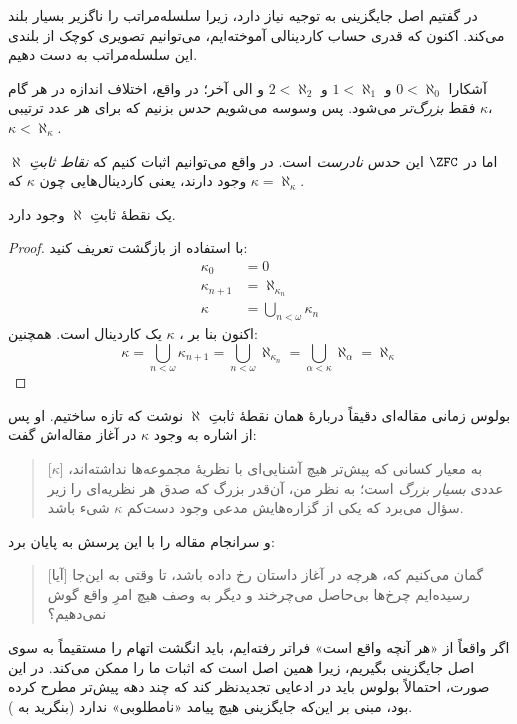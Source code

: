 \documentclass[../../../include/open-logic-section]{subfiles}
\begin{document}

در  گفتیم اصل جایگزینی به توجیه نیاز دارد، زیرا
سلسله‌مراتب را ناگزیر بسیار بلند می‌کند. اکنون که قدری حساب کاردینالی
آموخته‌ایم، می‌توانیم تصویری کوچک از بلندی این سلسله‌مراتب به دست دهیم.

آشکارا $0 < \aleph_0$ و $1 < \aleph_1$ و $2 < \aleph_2$ و الی آخر؛
در واقع، اختلاف اندازه در هر گام فقط \emph{بزرگ‌تر} می‌شود. پس وسوسه
می‌شویم حدس بزنیم که برای هر عدد ترتیبی $\kappa$،
$\kappa< \aleph_\kappa$.

اما در $\ZFC$ این حدس \emph{نادرست} است. در واقع می‌توانیم اثبات کنیم
که \emph{نقاط ثابتِ $\aleph$} وجود دارند، یعنی کاردینال‌هایی چون
$\kappa$ که $\kappa=\aleph_\kappa$.

\begin{prop}
یک نقطهٔ ثابتِ $\aleph$ وجود دارد.
\end{prop}

\begin{proof}
با استفاده از بازگشت تعریف کنید:
\begin{align*}
	\kappa_0 &= 0\\
	\kappa_{n+1} &= \aleph_{\kappa_n}\\
	\kappa&= \bigcup_{n < \omega}\kappa_n
\end{align*}
اکنون بنا بر ،
$\kappa$ یک کاردینال است. همچنین:
\[
	\kappa= \bigcup_{n < \omega} \kappa_{n+1} =
	\bigcup_{n < \omega}\aleph_{\kappa_n} =
	\bigcup_{\alpha < \kappa}\aleph_\alpha = \aleph_\kappa
\]
\end{proof}

بولوس زمانی مقاله‌ای دقیقاً دربارهٔ همان نقطهٔ ثابتِ $\aleph$ نوشت که
تازه ساختیم. او پس از اشاره به وجود $\kappa$ در آغاز مقاله‌اش گفت:
\begin{quote}
	[$\kappa$] به معیار کسانی که پیش‌تر هیچ آشنایی‌ای با نظریهٔ
	مجموعه‌ها نداشته‌اند، عددی \emph{بسیار بزرگ} است؛ به نظر من، آن‌قدر
	بزرگ که صدق هر نظریه‌ای را زیر سؤال می‌برد که یکی از گزاره‌هایش مدعی
	وجود دست‌کم $\kappa$ شیء باشد.
	\citep[p.~257]{Boolos2000}
\end{quote}
و سرانجام مقاله را با این پرسش به پایان برد:
\begin{quote}
	[آیا] گمان می‌کنیم که، هرچه در آغاز داستان رخ داده باشد، تا وقتی به
	این‌جا رسیده‌ایم چرخ‌ها بی‌حاصل می‌چرخند و دیگر به وصف هیچ امرِ واقع
	گوش نمی‌دهیم؟
	\citep[p.~268]{Boolos2000}
\end{quote}
اگر واقعاً از «هر آنچه واقع است» فراتر رفته‌ایم، باید انگشت اتهام را
مستقیماً به سوی اصل جایگزینی بگیریم، زیرا همین اصل است که اثبات ما را
ممکن می‌کند. در این صورت، احتمالاً بولوس باید در ادعایی تجدیدنظر کند که
چند دهه پیش‌تر مطرح کرده بود، مبنی بر این‌که جایگزینی هیچ پیامد
«نامطلوبی» ندارد (بنگرید به ).
\end{document}
